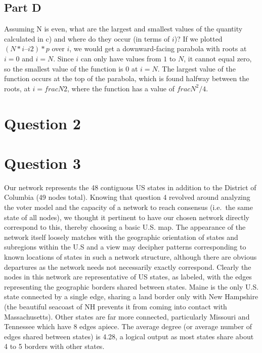 \documentclass[]{article}
\begin{document}
\hypertarget{part-d}{%
\subsection{Part D}\label{part-d}}

Assuming N is even, what are the largest and smallest values of the
quantity calculated in c) and where do they occur (in terms of \(i\))?
If we plotted \((N*i – i2)*p\) over \(i\), we would get a
downward-facing parabola with roots at \(i = 0\) and \(i = N\). Since
\(i\) can only have values from \(1\) to \(N\), it cannot equal zero, so
the smallest value of the function is \(0\) at \(i = N\). The largest
value of the function occurs at the top of the parabola, which is found
halfway between the roots, at \(i = frac{N}{2}\), where the function has
a value of \(frac{N^2}/{4}\).

\hypertarget{question-2}{%
\section{Question 2}\label{question-2}}

\hypertarget{question-3}{%
\section{Question 3}\label{question-3}}

Our network represents the 48 contiguous US states in addition to the
District of Columbia (49 nodes total). Knowing that question 4 revolved
around analyzing the voter model and the capacity of a network to reach
consensus (i.e.~the same state of all nodes), we thought it pertinent to
have our chosen network directly correspond to this, thereby choosing a
basic U.S. map. The appearance of the network itself loosely matches
with the geographic orientation of states and subregions within the U.S
and a view may decipher patterns corresponding to known locations of
states in such a network structure, although there are obvious
departures as the network needs not necessarily exactly correspond.
Clearly the nodes in this network are representative of US states, as
labeled, with the edges representing the geographic borders shared
between states. Maine is the only U.S. state connected by a single edge,
sharing a land border only with New Hampshire (the beautiful seacoast of
NH prevents it from coming into contact with Massachusetts). Other
states are far more connected, particularly Missouri and Tennessee which
have 8 edges apiece. The average degree (or average number of edges
shared between states) is 4.28, a logical output as most states share
about 4 to 5 borders with other states.
\end{document}
